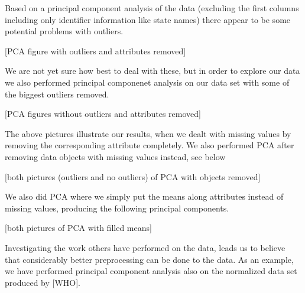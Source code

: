 Based on a principal component analysis of the data (excluding the first columns including only identifier information like state names) there appear to be some potential problems with outliers.

[PCA figure with outliers and attributes removed]

We are not yet sure how best to deal with these, but in order to explore our data we also performed principal componenet analysis on our data set with some of the biggest outliers removed.

[PCA figures without outliers and attributes removed]

The above pictures illustrate our results, when we dealt with missing values by removing the corresponding attribute completely. We also performed PCA after removing data objects with missing values instead, see below

[both pictures (outliers and no outliers) of PCA with objects removed]

We also did PCA where we simply put the means along attributes instead of missing values, producing the following principal components.

[both pictures of PCA with filled means]

Investigating the work others have performed on the data, leads us to believe that considerably better preprocessing can be done to the data. As an example, we have performed principal component analysis also on the normalized data set produced by [WHO].

